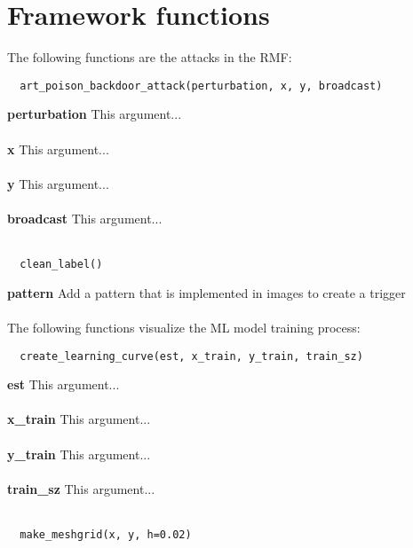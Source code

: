 \section{Framework functions}

The following functions are the attacks in the RMF: \\

\begin{lstlisting}
  art_poison_backdoor_attack(perturbation, x, y, broadcast)
\end{lstlisting}

\noindent\textbf{perturbation}
This argument... \\ \\
\textbf{x}
This argument... \\ \\
\textbf{y}
This argument... \\ \\
\textbf{broadcast}
This argument... \\ \\

\begin{lstlisting}
  clean_label()
\end{lstlisting}

\noindent\textbf{pattern}
Add a pattern that is implemented in images to create a trigger \\ \\

The following functions visualize the ML model training process: \\

\begin{lstlisting}
  create_learning_curve(est, x_train, y_train, train_sz)
\end{lstlisting}

\noindent\textbf{est}
This argument... \\ \\
\textbf{x\_train}
This argument... \\ \\
\textbf{y\_train}
This argument... \\ \\
\textbf{train\_sz}
This argument... \\ \\

\begin{lstlisting}
  make_meshgrid(x, y, h=0.02)
\end{lstlisting}

